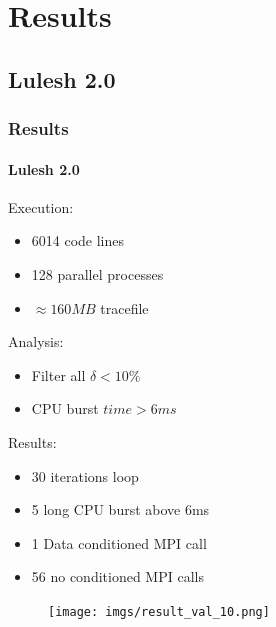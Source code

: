 \documentclass{beamer}
\begin{document}
\section{Results}
\subsection{Lulesh 2.0}
\begin{frame}
	\frametitle{Results}
	\framesubtitle{Lulesh 2.0}
	\begin{multicols*}{2}
	\begin{mdframed}[backgroundcolor=blue!10,roundcorner=10pt,linewidth=0pt]
	Execution:
	\begin{itemize}
		\item 6014 code lines
		\item 128 parallel processes
		\item $\approx160MB$ tracefile
	\end{itemize}
	Analysis:
	\begin{itemize}
		\item Filter all $\delta < 10\%$\\
		\item CPU burst $time > 6ms$
	\end{itemize}
	\end{mdframed}
	\pause
	Results:
	\begin{itemize}
		\item 30 iterations loop
		\item 5 long CPU burst above 6ms
		\item 1 Data conditioned MPI call
		\item 56 no conditioned MPI calls
	\end{itemize}
	\columnbreak
	\begin{figure}
		\texttt{[image: imgs/result\_val\_10.png]}
	\end{figure}
	\end{multicols*}
\end{frame}

\end{document}
